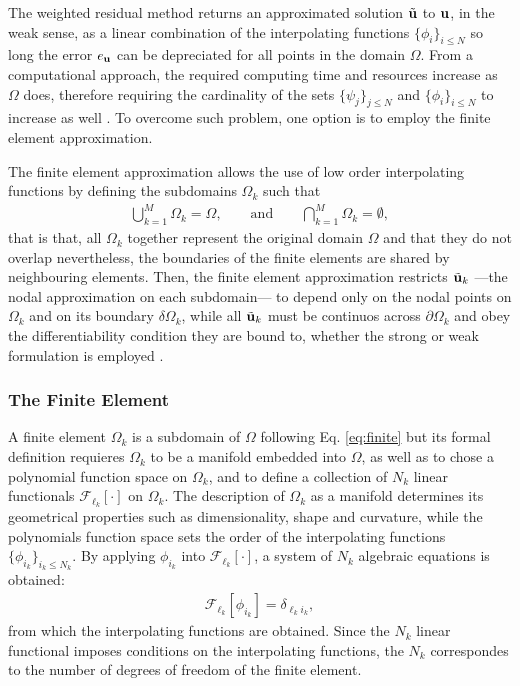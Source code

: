 

The weighted residual method returns an approximated solution $\tilde{\vb{u}}$ to $\vb{u}$, in the weak sense, as a linear combination of the interpolating functions $\{\phi_i\}_{i\leq N}$ so long the error $e_{\vb{u}}$ can be depreciated for all points in the domain $\Omega$. From a computational approach, the required computing time and resources increase as $\Omega$ does, therefore requiring the cardinality of the sets $\{\psi_j\}_{j\leq N}$ and  $\{\phi_i\}_{i\leq N}$ to increase as well \cite{dhatt_finite_2012}. To overcome such problem, one option is to employ the finite element approximation.

The finite element approximation allows the use of low order interpolating functions by defining the subdomains $\Omega_k$ such that
%
\begin{align}
    \bigcup_{k=1}^M \Omega_k = \Omega,
        \qquad
        \text{and}
        \qquad
    \bigcap_{k=1}^M \Omega_k = \emptyset,
\label{eq:finite}
\end{align}
%
that is that, all $\Omega_k$ together represent the original domain $\Omega$ and that they do not overlap nevertheless, the boundaries of the finite elements are shared by neighbouring elements. Then, the finite element approximation restricts  $\tilde{\vb{u}}_k$  ---the nodal approximation  on each subdomain--- to depend only on the nodal points on $\Omega_k$ and on its boundary $\delta\Omega_k$, while all $\tilde{\vb{u}}_k$ must be continuos across $\partial \Omega_k$ and obey the  differentiability condition they are bound to, whether the strong or weak formulation is employed \cite{dhatt_finite_2012}.

    \subsubsection{The Finite Element}

    A finite element $\Omega_k$ is a subdomain of $\Omega$ following Eq. \eqref{eq:finite} but its formal definition requieres $\Omega_k$ to be a manifold embedded into $\Omega$, as well as to chose a polynomial function space on $\Omega_k$, and to define a collection of $N_k$ linear functionals $\mathcal{F}_{\ell_k}[\cdot]$ on $\Omega_k$. The description of $\Omega_k$ as a manifold determines its geometrical properties such as dimensionality, shape and curvature, while the polynomials function space sets the order of the interpolating functions $\{\phi_{i_k}\}_{i_k\leq N_k}$. By applying $\phi_{i_k}$ into  $\mathcal{F}_{\ell_k}[\cdot]$, a system of $N_k$ algebraic  equations is obtained:
    \begin{align}
        \mathcal{F}_{\ell_k}[\phi_{i_k}] = \delta_{{\ell_k} {i_k}},
        \label{eq:linfunc}
    \end{align}
    from which the interpolating functions are obtained. Since the $N_k$ linear functional imposes conditions on the interpolating functions, the $N_k$ correspondes to the number of degrees of freedom of the finite element.

